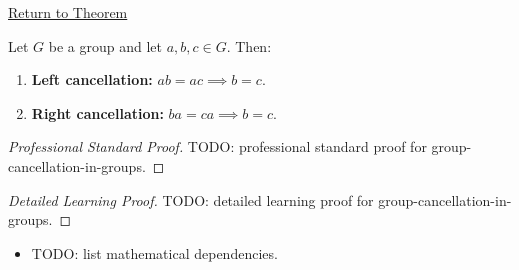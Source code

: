 \newpage
{}
\label{prf:group-cancellation-in-groups}

\begin{remark*}[Return]
\hyperref[prop:group-cancellation-in-groups]{Return to Theorem}
\end{remark*}

\begin{proposition*}
Let $G$ be a group and let $a, b, c \in G$. Then:
\begin{enumerate}[label=(\roman*)]
  \item \textbf{Left cancellation:} $ab = ac \implies b = c$.
  \item \textbf{Right cancellation:} $ba = ca \implies b = c$.
\end{enumerate}
\end{proposition*}

\begin{proof}[Professional Standard Proof]
\LRAProofBodyStart
TODO: professional standard proof for group-cancellation-in-groups.
\end{proof}

\begin{proof}[Detailed Learning Proof]
\LRAProofBodyStart
TODO: detailed learning proof for group-cancellation-in-groups.
\end{proof}

\begin{remark*}
\end{remark*}

\begin{dependencies}
\begin{itemize}
  \item TODO: list mathematical dependencies.
\end{itemize}
\end{dependencies}

\clearpage

